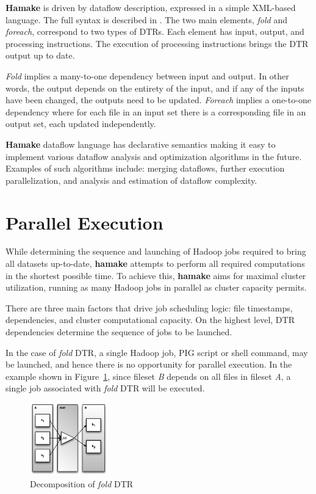 \documentclass[10pt,conference,letterpaper]{IEEEtran}
\begin{document}
\textbf{Hamake} is driven by dataflow description, expressed in a simple XML-based language. The full syntax is described in
\cite{hamakesyntax}. The two main elements, \emph{fold} and \emph{foreach}, correspond to two types of DTRs. Each element has input, output, and processing instructions. The execution of processing instructions brings the DTR output up to date. 

\emph{Fold} implies a many-to-one dependency between input and output. In other words, the output depends on the entirety of the input, and if any of the inputs have been changed, the outputs need to be updated. \emph{Foreach} implies a one-to-one dependency where for each file in an input set there is a corresponding file in an output set, each updated independently.

\textbf{Hamake} dataflow language has declarative semantics making it easy to implement various dataflow analysis and optimization algorithms in the future. Examples of such algorithms include: merging dataflows, further execution parallelization, and analysis and estimation of dataflow complexity.

\section{Parallel Execution}

While determining the sequence and launching of Hadoop jobs required to bring all datasets up-to-date, \textbf{hamake} attempts to perform all required computations in the shortest possible time. To achieve this, \textbf{hamake} aims for maximal cluster utilization, running as many Hadoop jobs in parallel as cluster capacity permits.

There are three main factors that drive job scheduling logic: file
timestamps, dependencies, and cluster computational capacity. On the
highest level, DTR dependencies determine the sequence of jobs to be 
launched.

In the case of \emph{fold} DTR, a single Hadoop job, PIG script or
shell command, may be launched, and hence there is no opportunity for parallel execution. In the example shown in
Figure~\ref{fig:fold2}, since fileset \textit{B} depends on all files in fileset \textit{A}, a single job associated with \emph{fold} DTR will be executed.

\begin{figure}[htp]
\centering
\includegraphics[width=0.3\textwidth]{twofoldp.eps}
\caption{Decomposition of \emph{fold} DTR}
\label{fig:fold2}
\end{figure}
\end{document}

